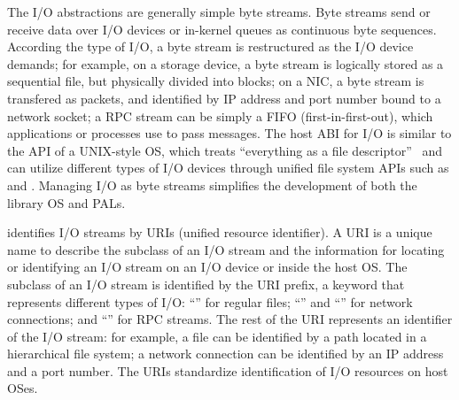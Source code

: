 The I/O abstractions are generally simple byte streams.
Byte streams send or receive data over I/O devices or in-kernel queues
as continuous byte sequences.
According the type of I/O, a byte stream is restructured as the I/O device demands;
for example, on a storage device,
a byte stream is logically stored as a sequential file,
but physically divided into blocks;
on a NIC, a byte stream is transfered as packets, and identified by IP address and port number bound to a network socket;
a RPC stream can be simply a FIFO (first-in-first-out),
which applications or processes use to pass messages.
The host ABI for I/O is similar to the API of a UNIX-style OS,
which treats ``everything as a file descriptor''~\cite{ritchie78unix-retro}
and can utilize different types of I/O devices through unified file system APIs such as  and .
Managing I/O as byte streams simplifies the development of both the library OS and PALs.


\Thehostabi{} identifies I/O streams by URIs (unified resource identifier).
A URI is a unique name to describe 
the subclass of an I/O stream and the information for locating or identifying an I/O stream on an I/O device or inside the host OS.
The subclass of an I/O stream is identified by the URI prefix,
a keyword that represents different types of I/O: ``'' for regular files; ``'' and ``'' for network connections; and ``'' for RPC streams.
The rest of the URI represents an identifier of the I/O stream:
for example, a file can be identified by a path located in a hierarchical file system;
a network connection can be identified by an IP address and a port number.
The URIs standardize identification of I/O resources on host OSes.





